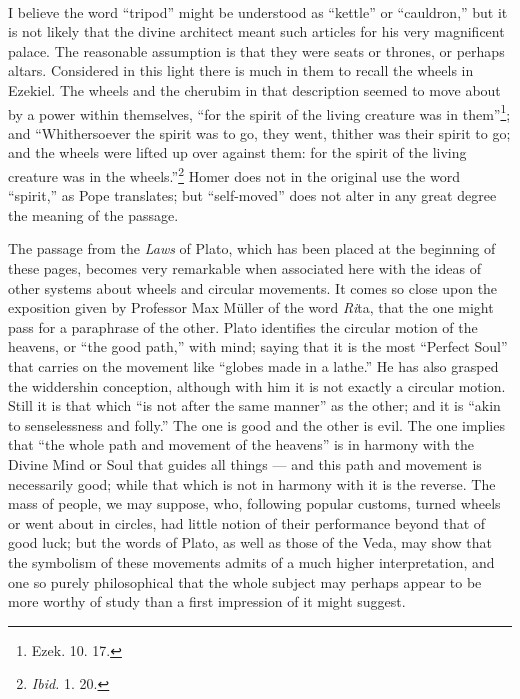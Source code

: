 \documentclass[a4paper, 11pt, oneside, polutonikogreek, english]{article}
\begin{document}
\paragraph{}
I believe the word ``tripod'' might be understood as ``kettle'' or ``cauldron,'' but it is not likely that the divine architect meant such articles for his very magnificent palace. The reasonable assumption is that they were seats or thrones, or perhaps altars. Considered in this light there is much in them to recall the wheels in Ezekiel. The wheels and the cherubim in that description seemed to move about by a power within themselves, ``for the spirit of the living creature was in them''\footnote{Ezek. 10. 17.}; and ``Whithersoever the spirit was to go, they went, thither was their spirit to go; and the wheels were lifted up over against them: for the spirit of the living creature was in the wheels.''\footnote{\emph{Ibid.} 1. 20.} Homer does not in the original use the word ``spirit,'' as Pope translates; but ``self-moved'' does not alter in any great degree the meaning of the passage.

The passage from the \emph{Laws} of Plato, which has been placed at the beginning of these pages, becomes very remarkable when associated here with the ideas of other systems about wheels and circular movements. It comes so close upon the exposition given by Professor Max Müller of the word \emph{Ri}ta, that the one might pass for a paraphrase of the other. Plato identifies the circular motion of the heavens, or ``the good path,'' with mind; saying that it is the most ``Perfect Soul'' that carries on the movement like ``globes made in a lathe.'' He has also grasped the widdershin conception, although with him it is not exactly a circular motion. Still it is that which ``is not after the same manner'' as the other; and it is ``akin to senselessness and folly.'' The one is good and the other is evil. The one implies that ``the whole path and movement of the heavens'' is in harmony with the Divine Mind or Soul that guides all things --- and this path and movement is necessarily good; while that which is not in harmony with it is the reverse. The mass of people, we may suppose, who, following popular customs, turned wheels or went about in circles, had little notion of their performance beyond that of good luck; but the words of Plato, as well as those of the Veda, may show that the symbolism of these movements admits of a much higher interpretation, and one so purely philosophical that the whole subject may perhaps appear to be more worthy of study than a first impression of it might suggest.
\end{document}
